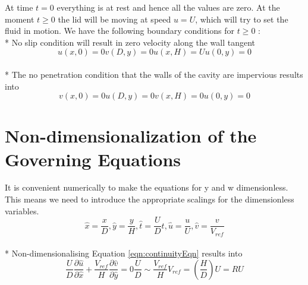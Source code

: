 \documentclass{article}
\begin{document}
At time $t=0$ everything is at rest and hence all the values are zero. At the moment $t \geq0$ the lid will be moving at speed $u=U$, which will try to set the fluid in motion. We have the following boundary conditions for $t\geq0$ :
\\*
No slip condition will result in zero velocity along the wall tangent
\begin{subequations}
\begin{equation}
u(x,0)=0
\end{equation}
\begin{equation}
v(D,y)=0
\end{equation}
\begin{equation}
u(x,H)=U
\end{equation}
\begin{equation}
u(0,y)=0
\end{equation}
\end{subequations}
\\*
The no penetration condition that the walls of the cavity are impervious results into
\begin{subequations}
\begin{equation}
v(x,0)=0
\end{equation}
\begin{equation}
u(D,y)=0
\end{equation}
\begin{equation}
v(x,H)=0
\end{equation}
\begin{equation}
u(0,y)=0
\end{equation}
\end{subequations}


\section{Non-dimensionalization of the Governing Equations}
It is convenient numerically to make the equations for y and w dimensionless. This means we need to introduce the appropriate scalings for the dimensionless variables.
\begin{equation}
\hat{x}=\frac{x}{D}, \hat{y}=\frac{y}{H},  \hat{t}=\frac{U}{D}t,  \hat{u}=\frac{u}{U},  \hat{v}=\frac{v}{V_{ref}}
\end{equation}
\\*
Non-dimensionalising Equation \ref{eqn:continuityEqn} results into 
\begin{subequations}
\begin{equation}
\frac{U}{D}\frac{\partial \hat{u}}{\partial \hat{x}} + \frac{V_{ref}}{H}\frac{\partial \hat{v}}{\partial \hat{y}} = 0  
\end{equation}
\begin{equation}
\frac{U}{D}\sim \frac{V_{ref}}{H}  
\end{equation}
\begin{equation}
V_{ref}= \left(\frac{H}{D}\right)U = RU  
\end{equation}
\end{subequations}
\end{document}
